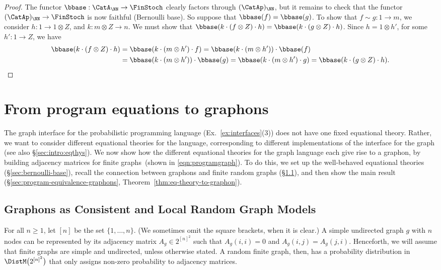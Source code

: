 \begin{proof}
  The functor $\bbase:\CatA_\NN\to \FinStoch$ clearly factors through $(\CatAp)_\NN$,
  but it remains to check that the functor $(\CatAp)_\NN\to \FinStoch$ is now
  faithful (Bernoulli base). 
  So suppose that $\bbase(f)=\bbase(g)$. To show that $f\sim g :1\to
  m$, 
  we consider $h:1\to 1\otimes Z$, and $k:m\otimes Z\to n$.
  We must show that $\bbase(k\cdot (f\otimes Z)\cdot h)=\bbase(k\cdot (g\otimes Z)\cdot
  h)$.
  Since $h=1\otimes h'$, for some $h':1\to Z$,
  we have
  \begin{align*}
    \bbase(k\cdot (f\otimes Z)\cdot h)&=\bbase(k\cdot(m\otimes h')\cdot f)
    =
    \bbase(k\cdot(m\otimes h'))\cdot \bbase(f)\\
    &=
    \bbase(k\cdot(m\otimes h'))\cdot \bbase(g)
    =
    \bbase(k\cdot(m\otimes h')\cdot g)
    =
    \bbase(k\cdot (g\otimes Z)\cdot h)\text.\end{align*}
\end{proof}





\section{From program equations to graphons}\label{sec:prog-eq-to-graphons}

The graph interface for the probabilistic programming language (Ex.~\ref{ex:interfaces}(3))
does not have one fixed equational theory. Rather, we want to consider different equational theories for the language, corresponding to different implementations of the interface for the graph (see also \S\ref{sec:intro:eqthys}).
We now show how the different equational theories for the graph language each
give rise to a graphon, by building adjacency matrices for finite graphs~(shown in \eqref{eqn:programgraph}). To do this, we set up the well-behaved equational theories (\S\ref{sec:bernoulli-base}), recall the connection between graphons and finite random graphs (\S\ref{sec:graphons}), and then show the main result (\S\ref{sec:program-equivalence-graphons}, Theorem~\ref{thm:eq-theory-to-graphon}). 


\subsection{Graphons as Consistent and Local Random Graph Models}
\label{sec:graphons}
For all $n ≥ 1$, let $[n]$ be the set $\{1,…,n\}$. (We sometimes omit
the square brackets, when it is clear.)
A simple undirected graph $g$ with $n$ nodes can be represented by its adjacency matrix $A_g\in 2^{[n]^2}$ such that $A_g(i,i)=0$ and $A_g(i,j)= A_g(j,i)$. Henceforth, we will assume that finite graphs are simple and undirected, unless otherwise stated. 
A random finite graph, then, has a probability distribution in
$\DistM\big(2^{[n]^2}\big)$ that only assigns non-zero probability to adjacency matrices.

